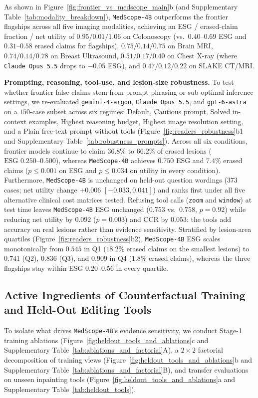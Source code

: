 \documentclass[journal]{IEEEtran}
\begin{document}
As shown in Figure~\ref{fig:frontier_vs_medscope_main}b (and Supplementary Table~\ref{tab:modality_breakdown}), \texttt{MedScope-4B} outperforms the frontier flagships across all five imaging modalities, achieving an ESG / erased-claim fraction / net utility of $0.95 / 0.01 / 1.06$ on Colonoscopy (vs.\ $0.40\text{--}0.69$ ESG and $0.31\text{--}0.58$ erased claims for flagships), $0.75 / 0.14 / 0.75$ on Brain MRI, $0.74 / 0.14 / 0.78$ on Breast Ultrasound, $0.51 / 0.17 / 0.40$ on Chest X-ray (where \texttt{Claude Opus 5.5} drops to $-0.05$ ESG), and $0.47 / 0.12 / 0.22$ on SLAKE CT/MRI.

\textbf{Prompting, reasoning, tool-use, and lesion-size robustness.} To test whether frontier false claims stem from prompt phrasing or sub-optimal inference settings, we re-evaluated \texttt{gemini-4-argon}, \texttt{Claude Opus 5.5}, and \texttt{gpt-6-astra} on a $150$-case subset across six regimes: Default, Cautious prompt, Solved in-context examples, Highest reasoning budget, Highest image resolution setting, and a Plain free-text prompt without tools (Figure~\ref{fig:readers_robustness}b1 and Supplementary Table~\ref{tab:robustness_prompts}). Across all six conditions, frontier models continue to claim $36.8\%$ to $66.2\%$ of erased lesions ($\text{ESG } 0.250\text{--}0.500$), whereas \texttt{MedScope-4B} achieves $0.750$ ESG and $7.4\%$ erased claims ($p \le 0.001$ on ESG and $p \le 0.034$ on utility in every condition). Furthermore, \texttt{MedScope-4B} is unchanged on held-out question wordings ($373$ cases; net utility change $+0.006$ $[-0.033, 0.041]$) and ranks first under all five alternative clinical cost matrices tested. Refusing tool calls (\texttt{zoom} and \texttt{window}) at test time leaves \texttt{MedScope-4B} ESG unchanged ($0.753$ vs.\ $0.758$, $p = 0.92$) while reducing net utility by $0.092$ ($p = 0.003$) and CCR by $0.053$: the tools add accuracy on real lesions rather than evidence sensitivity. Stratified by lesion-area quartiles (Figure~\ref{fig:readers_robustness}b2), \texttt{MedScope-4B} ESG scales monotonically from $0.545$ in Q1 ($18.2\%$ erased claims on the smallest lesions) to $0.741$ (Q2), $0.836$ (Q3), and $0.909$ in Q4 ($1.8\%$ erased claims), whereas the three flagships stay within ESG $0.20\text{--}0.56$ in every quartile.

\subsection{Active Ingredients of Counterfactual Training and Held-Out Editing Tools}
\label{subsec:exp_ablations_tools}
To isolate what drives \texttt{MedScope-4B}'s evidence sensitivity, we conduct Stage-1 training ablations (Figure~\ref{fig:heldout_tools_and_ablations}c and Supplementary Table~\ref{tab:ablations_and_factorial}A), a $2\times 2$ factorial decomposition of training views (Figure~\ref{fig:heldout_tools_and_ablations}b and Supplementary Table~\ref{tab:ablations_and_factorial}B), and transfer evaluations on unseen inpainting tools (Figure~\ref{fig:heldout_tools_and_ablations}a and Supplementary Table~\ref{tab:heldout_tools}).
\end{document}
